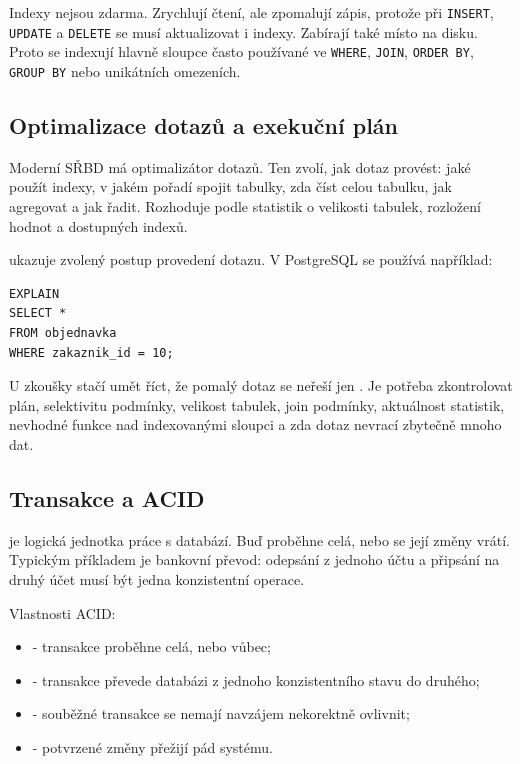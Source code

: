 Indexy nejsou zdarma. Zrychlují čtení, ale zpomalují zápis, protože při \texttt{INSERT},
\texttt{UPDATE} a \texttt{DELETE} se musí aktualizovat i indexy. Zabírají také místo na disku. Proto
se indexují hlavně sloupce často používané ve \texttt{WHERE}, \texttt{JOIN}, \texttt{ORDER BY},
\texttt{GROUP BY} nebo unikátních omezeních.

\subsection{Optimalizace dotazů a exekuční plán}
Moderní SŘBD má optimalizátor dotazů. Ten zvolí, jak dotaz provést: jaké použít indexy, v jakém pořadí
spojit tabulky, zda číst celou tabulku, jak agregovat a jak řadit. Rozhoduje podle statistik o velikosti
tabulek, rozložení hodnot a dostupných indexů.

 ukazuje zvolený postup provedení dotazu. V PostgreSQL se používá například:

{\small
\begin{verbatim}
EXPLAIN
SELECT *
FROM objednavka
WHERE zakaznik_id = 10;
\end{verbatim}
}

U zkoušky stačí umět říct, že pomalý dotaz se neřeší jen . Je potřeba zkontrolovat
plán, selektivitu podmínky, velikost tabulek, join podmínky, aktuálnost statistik, nevhodné funkce
nad indexovanými sloupci a zda dotaz nevrací zbytečně mnoho dat.

\subsection{Transakce a ACID}
 je logická jednotka práce s databází. Buď proběhne celá, nebo se její změny vrátí.
Typickým příkladem je bankovní převod: odepsání z jednoho účtu a připsání na druhý účet musí být
jedna konzistentní operace.

Vlastnosti ACID:
\begin{itemize}
  \item {} - transakce proběhne celá, nebo vůbec;
  \item {} - transakce převede databázi z jednoho konzistentního stavu do druhého;
  \item {} - souběžné transakce se nemají navzájem nekorektně ovlivnit;
  \item {} - potvrzené změny přežijí pád systému.
\end{itemize}

